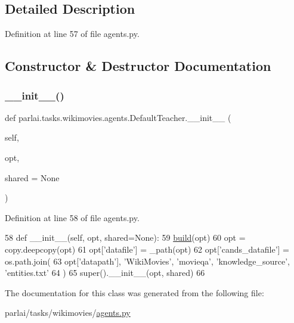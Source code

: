 \subsection{Detailed Description}


Definition at line 57 of file agents.\+py.



\subsection{Constructor \& Destructor Documentation}
\mbox{\label{classparlai_1_1tasks_1_1wikimovies_1_1agents_1_1DefaultTeacher_a4bef6f1b4e0fff6a37c8ec1441cd9e6c}} 
\subsubsection{\texorpdfstring{\+\_\+\+\_\+init\+\_\+\+\_\+()}{\_\_init\_\_()}}
{\footnotesize\ttfamily def parlai.\+tasks.\+wikimovies.\+agents.\+Default\+Teacher.\+\_\+\+\_\+init\+\_\+\+\_\+ (\begin{DoxyParamCaption}\item[{}]{self,  }\item[{}]{opt,  }\item[{}]{shared = {\ttfamily None} }\end{DoxyParamCaption})}



Definition at line 58 of file agents.\+py.


\begin{DoxyCode}
58     \textcolor{keyword}{def }\_\_init\_\_(self, opt, shared=None):
59         \hyperlink{namespaceparlai_1_1mturk_1_1tasks_1_1talkthewalk_1_1download_a8c0fbb9b6dfe127cb8c1bd6e7c4e33fd}{build}(opt)
60         opt = copy.deepcopy(opt)
61         opt[\textcolor{stringliteral}{'datafile'}] = \_path(opt)
62         opt[\textcolor{stringliteral}{'cands\_datafile'}] = os.path.join(
63             opt[\textcolor{stringliteral}{'datapath'}], \textcolor{stringliteral}{'WikiMovies'}, \textcolor{stringliteral}{'movieqa'}, \textcolor{stringliteral}{'knowledge\_source'}, \textcolor{stringliteral}{'entities.txt'}
64         )
65         super().\_\_init\_\_(opt, shared)
66 \end{DoxyCode}


The documentation for this class was generated from the following file\+:\begin{DoxyCompactItemize}
\item 
parlai/tasks/wikimovies/\hyperlink{parlai_2tasks_2wikimovies_2agents_8py}{agents.\+py}\end{DoxyCompactItemize}
